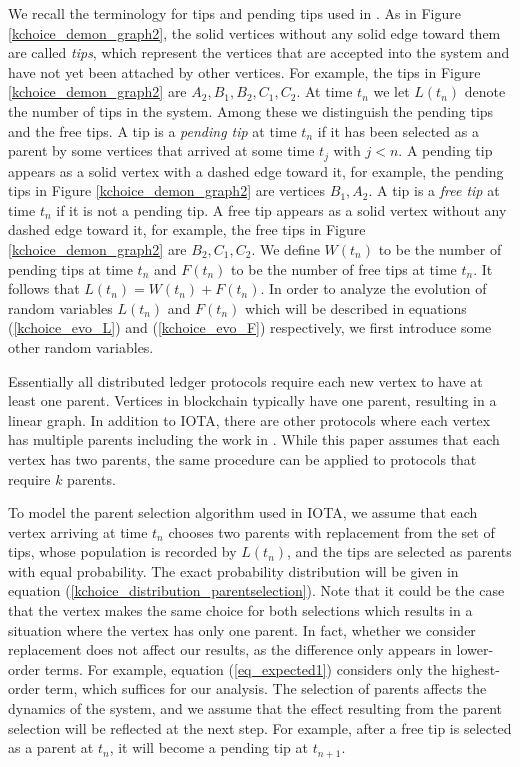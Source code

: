 \documentclass[12pt]{article}
\numberwithin{equation}{section}  %
\begin{document}
We recall the terminology for tips and pending tips used in \cite{Ck21}. As in Figure \ref{kchoice_demon_graph2}, the solid vertices without any solid edge toward them are called \textit{tips}, which represent the vertices that are accepted into the system and have not yet been attached by other vertices. For example, the tips in Figure \ref{kchoice_demon_graph2} are $A_2,B_1,B_2,C_1,C_2$. At time $t_n$ we let $L(t_n)$ denote the number of tips in the system. Among these we distinguish the pending tips and the free tips. A tip is a \textit{pending tip} at time $t_n$ if it has been selected as a parent by some vertices that arrived at some time $t_j$ with $j < n$. A pending tip appears as a solid vertex with a dashed edge toward it, for example, the pending tips in Figure \ref{kchoice_demon_graph2} are vertices $B_1,A_2$. A tip is a \textit{free tip} at time $t_n$ if it is not a pending tip. A free tip appears as a solid vertex without any dashed edge toward it, for example, the free tips in Figure \ref{kchoice_demon_graph2} are $B_2,C_1,C_2$. We define $W(t_n)$ to be the number of pending tips at time $t_n$ and $F(t_n)$ to be the number of free tips at time $t_n$. It follows that $L(t_n) = W(t_n) + F(t_n)$. In order to analyze the evolution of random variables $L(t_n)$ and $F(t_n)$ which will be described in equations {(\ref{kchoice_evo_L})} and (\ref{kchoice_evo_F}) respectively, we first introduce some other random variables.

Essentially all distributed ledger protocols require each new vertex to have at least one parent. Vertices in blockchain typically have one parent, resulting in a linear graph. In addition to IOTA, there are other protocols where each vertex has multiple parents including the work in \cite{sompolinsky2016spectre,So21PHANTOM}. While this paper assumes that each vertex has two parents, the same procedure can be applied to protocols that require $k$ parents.

To model the parent selection algorithm used in IOTA, we assume that each vertex arriving at time $t_n$ chooses two parents with replacement from the set of tips, whose population is recorded by $L(t_n)$, and the tips are selected as parents with equal probability. The exact probability distribution will be given in equation (\ref{kchoice_distribution_parentselection}). Note that it could be the case that the vertex makes the same choice for both selections which results in a situation where the vertex has only one parent. In fact, whether we consider replacement does not affect our results, as the difference only appears in lower-order terms. For example, equation (\ref{eq_expected1}) considers only the highest-order term, which suffices for our analysis. The selection of parents affects the dynamics of the system, and we assume that the effect resulting from the parent selection will be reflected at the next step. For example, after a free tip is selected as a parent at $t_n$, it will become a pending tip at $t_{n+1}$.
\end{document}
